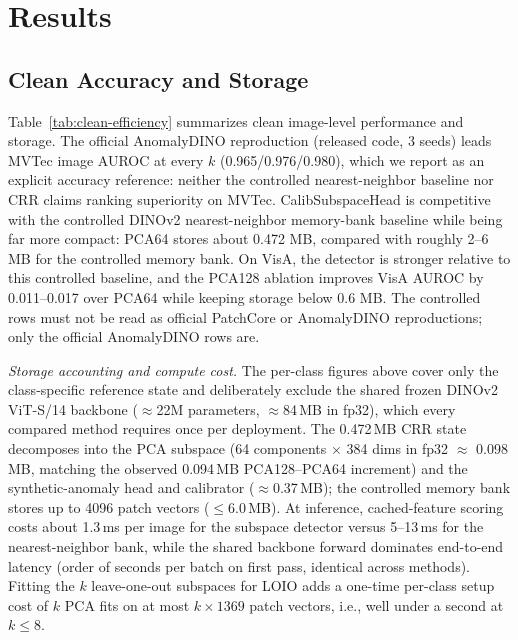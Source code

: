 \section{Results}
\label{sec:results}
\subsection{Clean Accuracy and Storage}

Table~\ref{tab:clean-efficiency} summarizes clean image-level performance and storage. The official AnomalyDINO reproduction (released code, 3 seeds) leads MVTec image AUROC at every $k$ (0.965/0.976/0.980), which we report as an explicit accuracy reference: neither the controlled nearest-neighbor baseline nor CRR claims ranking superiority on MVTec. CalibSubspaceHead is competitive with the controlled DINOv2 nearest-neighbor memory-bank baseline while being far more compact: PCA64 stores about 0.472 MB, compared with roughly 2--6 MB for the controlled memory bank. On VisA, the detector is stronger relative to this controlled baseline, and the PCA128 ablation improves VisA AUROC by 0.011--0.017 over PCA64 while keeping storage below 0.6 MB. The controlled rows must not be read as official PatchCore or AnomalyDINO reproductions; only the official AnomalyDINO rows are.

\emph{Storage accounting and compute cost.} The per-class figures above cover only the class-specific reference state and deliberately exclude the shared frozen DINOv2 ViT-S/14 backbone ($\approx$22M parameters, $\approx$84\,MB in fp32), which every compared method requires once per deployment. The 0.472\,MB CRR state decomposes into the PCA subspace (64 components $\times$ 384 dims in fp32 $\approx$ 0.098\,MB, matching the observed 0.094\,MB PCA128--PCA64 increment) and the synthetic-anomaly head and calibrator ($\approx$0.37\,MB); the controlled memory bank stores up to 4096 patch vectors ($\le$6.0\,MB). At inference, cached-feature scoring costs about 1.3\,ms per image for the subspace detector versus 5--13\,ms for the nearest-neighbor bank, while the shared backbone forward dominates end-to-end latency (order of seconds per batch on first pass, identical across methods). Fitting the $k$ leave-one-out subspaces for LOIO adds a one-time per-class setup cost of $k$ PCA fits on at most $k{\times}1369$ patch vectors, i.e., well under a second at $k\le8$.

